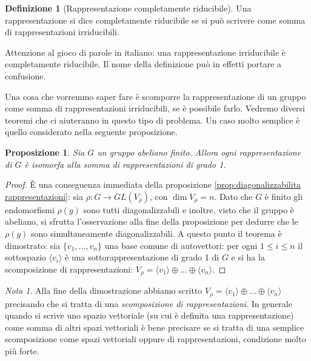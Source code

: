 \documentclass[11pt]{article}
\theoremstyle{plain}
\newtheorem{prop}[thm]{Proposizione}
\theoremstyle{definition}
\newtheorem{defn}{Definizione}[section]
\theoremstyle{remark}
\newtheorem*{note}{Nota}
\begin{document}
\begin{defn}[Rappresentazione completamente riducibile]
Una rappresentazione si dice completamente riducibile se si può scrivere come somma di rappresentazioni irriducibili.
\end{defn}
Attenzione al gioco di parole in italiano: una rappresentazione irriducibile è completamente riducibile. Il nome della definizione può in effetti portare a confusione.

Una cosa che vorremmo saper fare è scomporre la rappresentazione di un gruppo come somma di rappresentazioni irriducibili, se è possibile farlo. Vedremo diversi teoremi che ci aiuteranno in questo tipo di problema. Un caso molto semplice è quello considerato nella seguente proposizione.
\begin{prop}
\label{prop:rapp abeliani}
Sia $G$ un gruppo abeliano finito. Allora ogni rappresentazione di $G$ è isomorfa alla somma di rappresentazioni di grado 1.
\end{prop}
\begin{proof}
	\`E una conseguenza immediata della proposizione \eqref{prop:diagonalizzabilita rappresentazioni}: sia $\rho:G\to GL(V_{\rho})$, con $\dim V_{\rho} = n$.
	Dato che $G$ è finito gli endomorfismi $\rho(g)$ sono tutti diagonalizzabili e inoltre, visto che il gruppo è abeliano, si sfrutta l'osservazione alla fine della proposizione per dedurre che le $\rho(g)$ sono simultaneamente diagonalizzabili. A questo punto il teorema è dimostrato: sia $\{v_1,\ldots,v_n\}$ una base comune di autovettori: per ogni $1\leq i\leq n$ il sottospazio $\langle v_i\rangle$ è una sottorappresentazione di grado 1 di $G$ e si ha la scomposizione di rappresentazioni: $V_{\rho}=\langle v_1\rangle\oplus\ldots\oplus \langle v_n\rangle$.
\end{proof}
\begin{note}
Alla fine della dimostrazione abbiamo scritto $V_{\rho}=\langle v_1\rangle\oplus\ldots\oplus \langle v_n\rangle$
precisando che si tratta di una \emph{scomposizione di rappresentazioni}. In generale quando si scrive uno spazio vettoriale (su cui è definita una 
rappresentazione) come somma di altri spazi vettoriali è bene precisare se si tratta di una semplice scomposizione come spazi vettoriali oppure
di rappresentazioni, condizione molto più forte.
\end{note}
\end{document}
